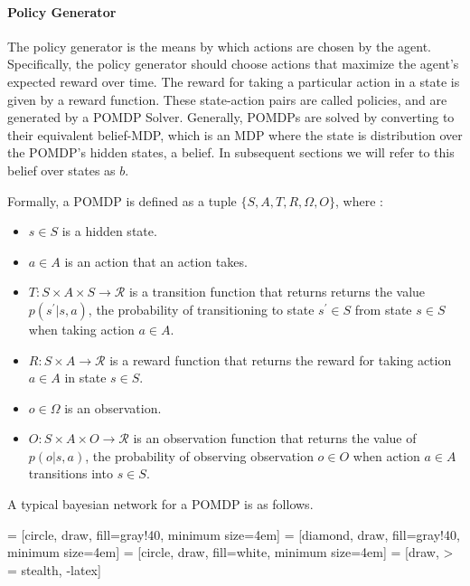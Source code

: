 \documentclass{article}
\begin{document}
\paragraph{Policy Generator}

The policy generator is the means by which actions are chosen by the agent. Specifically, the policy generator should choose actions that maximize the agent's expected reward over time. The reward for taking a particular action in a state is given by a reward function. These state-action pairs are called policies, and are generated by a POMDP Solver. Generally, POMDPs are solved by converting to their equivalent belief-MDP, which is an MDP where the state is distribution over the POMDP's hidden states, a belief. In subsequent sections we will refer to this belief over states as $b$. 


Formally, a POMDP is defined as a tuple $\{S, A, T, R, \Omega, O\}$, where : 
\begin{itemize}
	\item $s \in S$ is a hidden state. 
	\item $a \in A$ is an action that an action takes. 
	\item $T: S \times A \times S \to \mathcal{R}$ is a transition function that returns returns the value $p(s^\prime | s, a)$, the probability of transitioning to state $s^\prime \in  S$ from state $s \in S$ when taking action $a \in A$. 
	\item $R: S \times A \to \mathcal{R}$ is a reward function that returns the reward for taking action $a \in A$ in state $s \in S$. 
	\item $o \in \Omega$ is an observation. 
	\item $O: S \times A \times O \to \mathcal{R}$ is an observation function that returns the value of $p(o | s, a)$, the probability of observing observation $o \in O$ when action $a \in A$ transitions into $s \in S$. 
\end{itemize}

A typical bayesian network for a POMDP is as follows. 

 = [circle, draw, fill=gray!40, minimum size=4em]
 = [diamond, draw, fill=gray!40, minimum size=4em]
 = [circle, draw, fill=white, minimum size=4em]
 = [draw, > = stealth, -latex]
\end{document}
